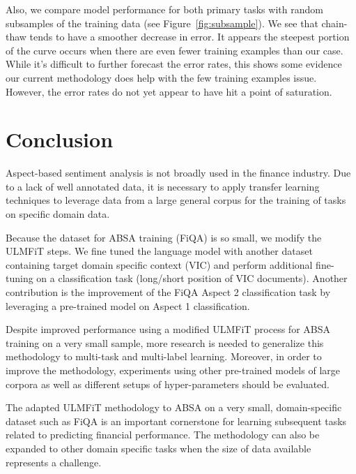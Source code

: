 \documentclass[11pt,a4paper]{article}
\begin{document}
Also, we compare model performance for both primary tasks with random subsamples of the training data (see Figure~\ref{fig:subsample}). We see that chain-thaw tends to have a smoother decrease in error. It appears the steepest portion of the curve occurs when there are even fewer training examples than our case. While it's difficult to further forecast the error rates, this shows some evidence our current methodology does help with the few training examples issue. However, the error rates do not yet appear to have hit a point of saturation.


\section{Conclusion}
\label{sec:conclusion}
Aspect-based sentiment analysis is not broadly used in the finance industry. Due to a lack of well annotated data, it is necessary to apply transfer learning techniques to leverage data from a large general corpus for the training of tasks on specific domain data.

Because the dataset for ABSA training (FiQA) is so small, we modify the ULMFiT steps. We fine tuned the language model with another dataset containing target domain specific context (VIC) and perform additional fine-tuning on a classification task (long/short position of VIC documents). Another contribution is the improvement of the FiQA Aspect 2 classification task by leveraging a pre-trained model on Aspect 1 classification.

Despite improved performance using a modified ULMFiT process for ABSA training on a very small sample, more research is needed to generalize this methodology to multi-task and multi-label learning. Moreover, in order to improve the methodology, experiments using other pre-trained models of large corpora as well as different setups of hyper-parameters should be evaluated.

The adapted ULMFiT methodology to ABSA on a very small, domain-specific dataset such as FiQA is an important cornerstone for learning subsequent tasks related to predicting financial performance. The methodology can also be expanded to other domain specific tasks when the size of data available represents a challenge.

\nocite{*}


\end{document}
